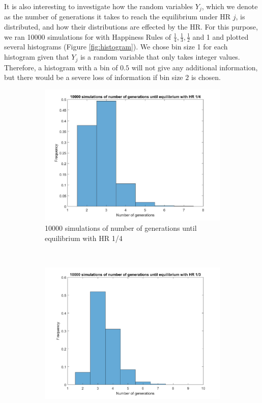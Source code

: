 It is also interesting to investigate how the random variables $Y_j$, which we denote as the number of generations it takes to reach the equilibrium under HR $j$, is distributed, and how their distributions are effected by the HR. 
For this purpose, we ran 10000 simulations for with Happiness Rules of \(\frac{1}{4},\frac{1}{3},\frac{1}{2}\) and 1 and plotted several histograms (Figure \ref{fig:histogram}). 
We chose bin size 1 for each histogram given that $Y_j$ is a random variable that only takes integer values. 
Therefore, a histogram with a bin of $0.5$ will not give any additional information, but there would be a severe loss of information if bin size $2$ is chosen. 

\begin{figure}[H]
    \centering
    \begin{subfigure}{0.45\textwidth}
        \includegraphics[width=\textwidth]{GenormHistogramAantalgen4.pdf}
        \caption{10000 simulations of number of generations until equilibrium with HR 1/4}
        \label{hist hap 1/4}
    \end{subfigure}
	~
    \begin{subfigure}{0.45\textwidth}
        \includegraphics[width=\textwidth]{GenormHistogramAantalgen.pdf}

\end{subfigure}
\end{figure}
